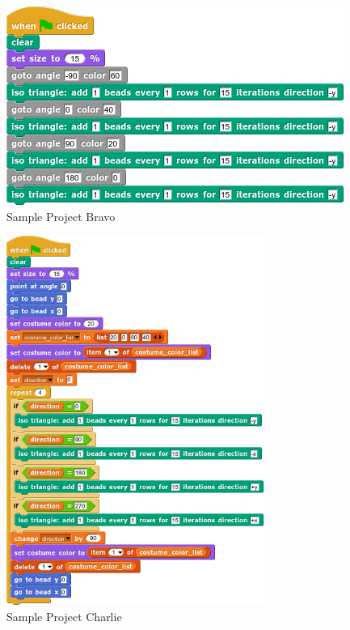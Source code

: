 \documentclass[]{article}
\begin{document}
\begin{figure}[h]
	\caption{Sample Project Bravo}
	\label{bravo}
	\centering
	\includegraphics{sample_csnap_applications/bravo.png}
\end{figure}

\begin{figure}[h]
	\caption{Sample Project Charlie}
	\label{charlie}
	\centering
	\includegraphics[width=0.75\textwidth]{sample_csnap_applications/charlie.png}
\end{figure}
\end{document}
